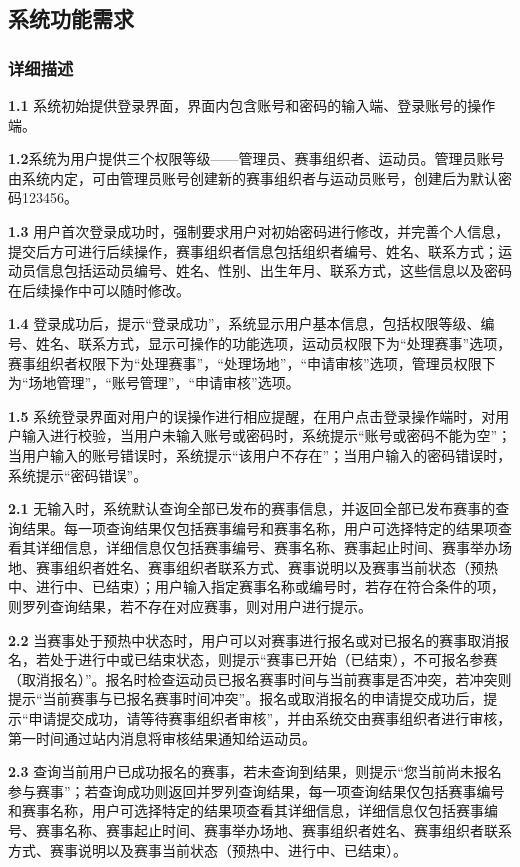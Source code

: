 \documentclass[a4paper,UTF8]{article}
\begin{document}
\subsection{系统功能需求}
\subsubsection{详细描述}
\textbf{1.1} 系统初始提供登录界面，界面内包含账号和密码的输入端、登录账号的操作端。

\textbf{1.2}系统为用户提供三个权限等级——管理员、赛事组织者、运动员。管理员账号由系统内定，可由管理员账号创建新的赛事组织者与运动员账号，创建后为默认密码123456。

\textbf{1.3} 用户首次登录成功时，强制要求用户对初始密码进行修改，并完善个人信息，提交后方可进行后续操作，赛事组织者信息包括组织者编号、姓名、联系方式；运动员信息包括运动员编号、姓名、性别、出生年月、联系方式，这些信息以及密码在后续操作中可以随时修改。

\textbf{1.4} 登录成功后，提示“登录成功”，系统显示用户基本信息，包括权限等级、编号、姓名、联系方式，显示可操作的功能选项，运动员权限下为“处理赛事”选项，赛事组织者权限下为“处理赛事”，“处理场地”，“申请审核”选项，管理员权限下为“场地管理”，“账号管理”，“申请审核”选项。

\textbf{1.5} 系统登录界面对用户的误操作进行相应提醒，在用户点击登录操作端时，对用户输入进行校验，当用户未输入账号或密码时，系统提示“账号或密码不能为空”；当用户输入的账号错误时，系统提示“该用户不存在”；当用户输入的密码错误时，系统提示“密码错误”。

\textbf{2.1} 无输入时，系统默认查询全部已发布的赛事信息，并返回全部已发布赛事的查询结果。每一项查询结果仅包括赛事编号和赛事名称，用户可选择特定的结果项查看其详细信息，详细信息仅包括赛事编号、赛事名称、赛事起止时间、赛事举办场地、赛事组织者姓名、赛事组织者联系方式、赛事说明以及赛事当前状态（预热中、进行中、已结束）；用户输入指定赛事名称或编号时，若存在符合条件的项，则罗列查询结果，若不存在对应赛事，则对用户进行提示。

\textbf{2.2} 当赛事处于预热中状态时，用户可以对赛事进行报名或对已报名的赛事取消报名，若处于进行中或已结束状态，则提示“赛事已开始（已结束），不可报名参赛（取消报名）”。报名时检查运动员已报名赛事时间与当前赛事是否冲突，若冲突则提示“当前赛事与已报名赛事时间冲突”。报名或取消报名的申请提交成功后，提示“申请提交成功，请等待赛事组织者审核”，并由系统交由赛事组织者进行审核，第一时间通过站内消息将审核结果通知给运动员。

\textbf{2.3} 查询当前用户已成功报名的赛事，若未查询到结果，则提示“您当前尚未报名参与赛事”；若查询成功则返回并罗列查询结果，每一项查询结果仅包括赛事编号和赛事名称，用户可选择特定的结果项查看其详细信息，详细信息仅包括赛事编号、赛事名称、赛事起止时间、赛事举办场地、赛事组织者姓名、赛事组织者联系方式、赛事说明以及赛事当前状态（预热中、进行中、已结束）。
\end{document}
